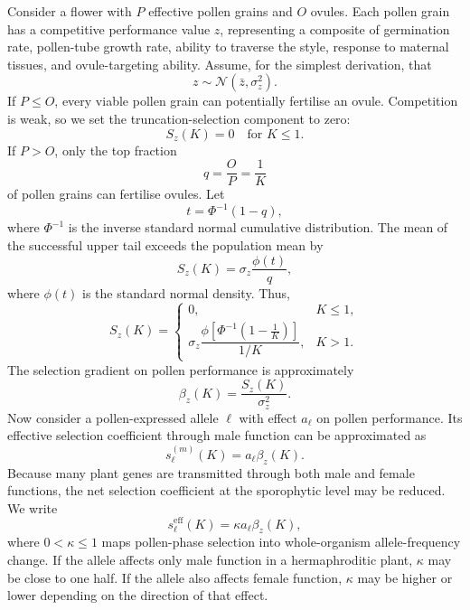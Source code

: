\documentclass[11pt]{article}
\newcommand{\Normal}{\mathcal{N}}
\begin{document}
Consider a flower with \(P\) effective pollen grains and \(O\) ovules. Each pollen grain has a competitive performance value \(z\), representing a composite of germination rate, pollen-tube growth rate, ability to traverse the style, response to maternal tissues, and ovule-targeting ability. Assume, for the simplest derivation, that
\begin{equation}
z \sim \Normal(\bar{z},\sigma_z^2).
\end{equation}
If \(P\leq O\), every viable pollen grain can potentially fertilise an ovule. Competition is weak, so we set the truncation-selection component to zero:
\begin{equation}
S_z(K)=0 \quad \text{for } K\leq 1.
\end{equation}
If \(P>O\), only the top fraction
\begin{equation}
q = \frac{O}{P} = \frac{1}{K}
\end{equation}
of pollen grains can fertilise ovules. Let
\begin{equation}
t = \Phi^{-1}(1-q),
\end{equation}
where \(\Phi^{-1}\) is the inverse standard normal cumulative distribution. The mean of the successful upper tail exceeds the population mean by
\begin{equation}
S_z(K) = \sigma_z \frac{\phi(t)}{q},
\end{equation}
where \(\phi(t)\) is the standard normal density. Thus,
\begin{equation}
S_z(K) = 
\begin{cases}
0, & K\leq 1,\\[6pt]
\sigma_z
\dfrac{
\phi\left[\Phi^{-1}\left(1-\frac{1}{K}\right)\right]
}{1/K}, & K>1.
\end{cases}
\label{eq:truncation_selection}
\end{equation}
The selection gradient on pollen performance is approximately
\begin{equation}
\beta_z(K) = \frac{S_z(K)}{\sigma_z^2}.
\end{equation}
Now consider a pollen-expressed allele \(\ell\) with effect \(a_\ell\) on pollen performance. Its effective selection coefficient through male function can be approximated as
\begin{equation}
s_{\ell}^{(m)}(K) = a_\ell \beta_z(K).
\end{equation}
Because many plant genes are transmitted through both male and female functions, the net selection coefficient at the sporophytic level may be reduced. We write
\begin{equation}
s_{\ell}^{\mathrm{eff}}(K) = \kappa a_\ell \beta_z(K),
\label{eq:seff}
\end{equation}
where \(0<\kappa\leq 1\) maps pollen-phase selection into whole-organism allele-frequency change. If the allele affects only male function in a hermaphroditic plant, \(\kappa\) may be close to one half. If the allele also affects female function, \(\kappa\) may be higher or lower depending on the direction of that effect.
\end{document}
